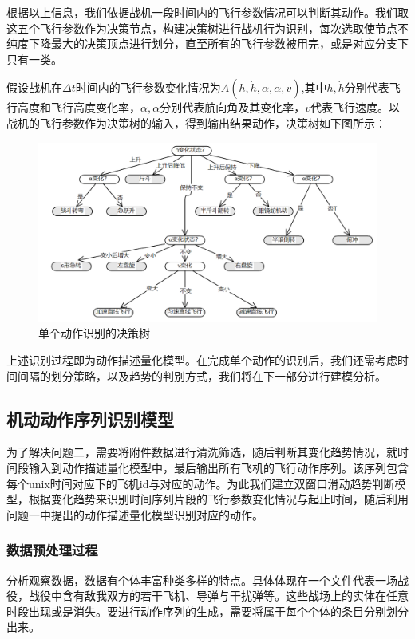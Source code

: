 \documentclass{my_paper}
\begin{document}
根据以上信息，我们依据战机一段时间内的飞行参数情况可以判断其动作。我们取这五个飞行参数作为决策节点，构建决策树进行战机行为识别，每次选取使节点不纯度下降最大的决策顶点进行划分，直至所有的飞行参数被用完，或是对应分支下只有一类。

假设战机在$\Delta t$时间内的飞行参数变化情况为$A(h,\dot{h},\alpha,\dot{\alpha},v )$,其中$h,\dot{h}$分别代表飞行高度和飞行高度变化率，$\alpha,\dot{\alpha}$分别代表航向角及其变化率，$v$代表飞行速度。以战机的飞行参数作为决策树的输入，得到输出结果动作，决策树如下图所示：

\begin {figure}[h]
\centering %
\includegraphics[width=\textwidth]{juece.png}
\caption{单个动作识别的决策树} %
\label{five}
\end {figure}

上述识别过程即为动作描述量化模型。在完成单个动作的识别后，我们还需考虑时间间隔的划分策略，以及趋势的判别方式，我们将在下一部分进行建模分析。

\subsection{机动动作序列识别模型}

为了解决问题二，需要将附件数据进行清洗筛选，随后判断其变化趋势情况，就时间段输入到动作描述量化模型中，最后输出所有飞机的飞行动作序列。该序列包含每个unix时间对应下的飞机id与对应的动作。为此我们建立双窗口滑动趋势判断模型，根据变化趋势来识别时间序列片段的飞行参数变化情况与起止时间，随后利用问题一中提出的动作描述量化模型识别对应的动作。

\subsubsection{数据预处理过程}

分析观察数据，数据有个体丰富种类多样的特点。具体体现在一个文件代表一场战役，战役中含有敌我双方的若干飞机、导弹与干扰弹等。这些战场上的实体在任意时段出现或是消失。要进行动作序列的生成，需要将属于每个个体的条目分别划分出来。
\end{document}
